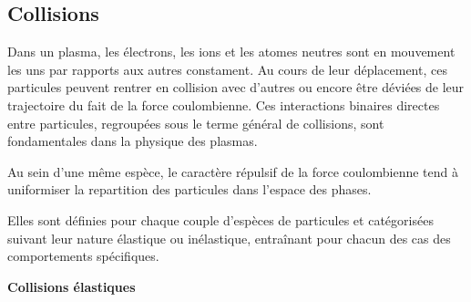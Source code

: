 		\subsection{Collisions}
			Dans un plasma, les électrons, les ions et les atomes neutres sont en mouvement les uns
			par rapports aux autres constament. 
			Au cours de leur déplacement, ces particules peuvent rentrer en collision avec d'autres
			ou encore être déviées de leur trajectoire du fait de la force coulombienne.
			Ces interactions binaires directes entre particules, regroupées sous 
			le terme général de collisions, sont fondamentales dans la physique des plasmas. 
			
			Au sein d'une même espèce, le caractère 
			répulsif de la force coulombienne tend à uniformiser la repartition des particules dans 
			l'espace des phases. 
			
			
			
			Elles sont définies pour chaque couple d'espèces de particules et catégorisées suivant
			leur nature élastique ou inélastique, entraînant pour chacun des cas des
			comportements spécifiques.
			
			\textbf{Collisions élastiques}
			
